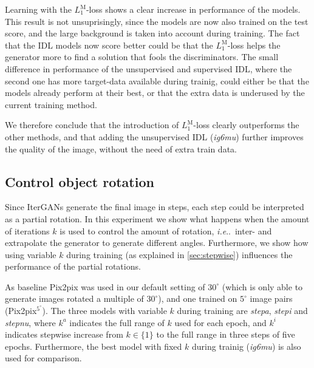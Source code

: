 \documentclass[runningheads]{llncs}
\makeatletter
\DeclareRobustCommand\onedot{\futurelet\@let@token\@onedot}
\def\@onedot{\ifx\@let@token.\else.\null\fi\xspace}
\def\ie{\emph{i.e}\onedot} \def\Ie{\emph{I.e}\onedot}
\let\wip\emph
\def\wmad{$L_1^{\textrm{M}}$\xspace}
\makeatother
\begin{document}
Learning with the \wmad-loss shows a clear increase in performance of the models.
This result is not unsuprisingly, since the models are now also trained on the test score, and the large background is taken into account during training.
The fact that the IDL models now score better could be that the \wmad-loss helps the generator more to find a solution that fools the discriminators.
The small difference in performance of the unsupervised and supervised IDL, where the second one has more target-data available during trainig, could either be that the models already perform at their best, or that the extra data is underused by the current training method.

We therefore conclude that the introduction of \wmad-loss clearly outperforms the other methods, and that adding the unsupervised IDL (\wip{ig6mu}) further improves the quality of the image, without the need of extra train data.

\subsection{Control object rotation}
Since IterGANs generate the final image in steps, each step could be interpreted as a partial rotation.
In this experiment we show what happens when the amount of iterations $k$ is used to control the amount of rotation, \ie~inter- and extrapolate the generator to generate different angles.
Furthermore, we show how using variable $k$ during training (as explained in \autoref{sec:stepwise}) influences the performance of the partial rotations.

As baseline Pix2pix was used in our default setting of $30^\circ$ (which is only able to generate images rotated a multiple of $30^\circ$), and one trained on $5^\circ$ image pairs (Pix2pix$^{5^\circ}$).
The three models with variable $k$ during training are \wip{stepa}, \wip{stepi} and \wip{stepnu}, where $k^a$ indicates the full range of $k$ used for each epoch, and $k^i$ indicates stepwise increase from $k\in\{1\}$ to the full range in three steps of five epochs.
Furthermore, the best model with fixed $k$ during trainig (\wip{ig6mu}) is also used for comparison.
\end{document}
